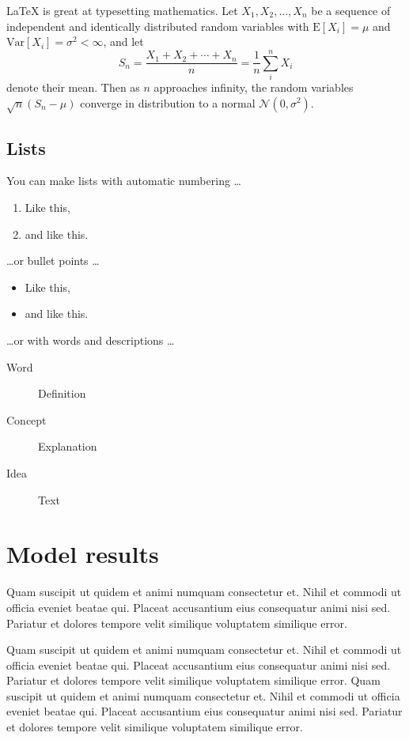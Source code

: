 \documentclass[fleqn,10pt]{physiome}
\begin{document}
\LaTeX{} is great at typesetting mathematics. Let $X_1, X_2, \ldots, X_n$ be a sequence of independent and identically distributed random variables with $\text{E}[X_i] = \mu$ and $\text{Var}[X_i] = \sigma^2 < \infty$, and let
\begin{equation}\label{eq:sum}
S_n = \frac{X_1 + X_2 + \cdots + X_n}{n}
      = \frac{1}{n}\sum_{i}^{n} X_i
\end{equation}
denote their mean. Then as $n$ approaches infinity, the random variables $\sqrt{n}(S_n - \mu)$ converge in distribution to a normal $\mathcal{N}(0, \sigma^2)$.

\subsection{Lists}

You can make lists with automatic numbering \dots

\begin{enumerate}[noitemsep] 
\item Like this,
\item and like this.
\end{enumerate}
\dots or bullet points \dots
\begin{itemize}[noitemsep] 
\item Like this,
\item and like this.
\end{itemize}
\dots or with words and descriptions \dots
\begin{description}
\item[Word] Definition
\item[Concept] Explanation
\item[Idea] Text
\end{description}

\section{Model results}
Quam suscipit ut quidem et animi numquam consectetur et. Nihil et commodi ut officia eveniet beatae qui. Placeat accusantium eius consequatur animi nisi sed. Pariatur et dolores tempore velit similique voluptatem similique error.

Quam suscipit ut quidem et animi numquam consectetur et. Nihil et commodi ut officia eveniet beatae qui. Placeat accusantium eius consequatur animi nisi sed. Pariatur et dolores tempore velit similique voluptatem similique error. Quam suscipit ut quidem et animi numquam consectetur et. Nihil et commodi ut officia eveniet beatae qui. Placeat accusantium eius consequatur animi nisi sed. Pariatur et dolores tempore velit similique voluptatem similique error.
\end{document}
